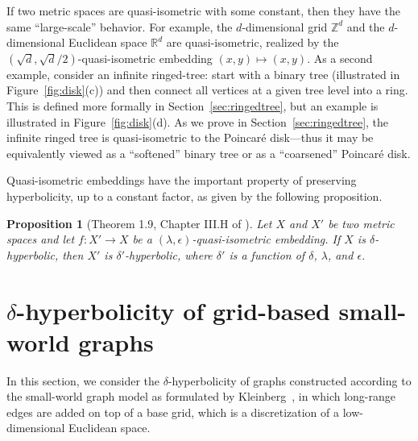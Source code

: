\documentclass[11pt]{article}
\newtheorem{prop}{Proposition}
\begin{document}
\noindent
If two metric spaces are quasi-isometric with some constant, then they have 
the same ``large-scale'' behavior. 
For example, the $d$-dimensional grid $\mathbb{Z}^d$ and the $d$-dimensional 
Euclidean space $\mathbb{R}^d$ are quasi-isometric, realized by the 
$(\sqrt{d}, \sqrt{d}/2)$-quasi-isometric embedding $(x,y) \mapsto (x,y)$.
As a second example, consider an infinite ringed-tree:
start with a binary tree (illustrated in Figure~\ref{fig:disk}(c)) and then 
connect all vertices at a given tree level into a ring.
This is defined more formally in Section~\ref{sec:ringedtree}, but an example
is illustrated in Figure~\ref{fig:disk}(d).
As we prove in Section~\ref{sec:ringedtree}, the infinite ringed tree is quasi-isometric to the 
Poincar\'{e} disk---thus it may be equivalently viewed as a ``softened'' 
binary tree or as a ``coarsened'' Poincar\'{e} disk.

Quasi-isometric embeddings have the important property of preserving 
hyperbolicity, up to a constant factor, as given by the following proposition.

\begin{prop}[Theorem 1.9, Chapter III.H of \cite{BH99}]\label{prop:quasi}
Let $X$ and $X'$ be two metric spaces and let $f: X' \rightarrow X$ be a 
	$(\lambda, \epsilon)$-quasi-isometric embedding.
If $X$ is $\delta$-hyperbolic, then $X'$ is $\delta'$-hyperbolic, where
	$\delta'$ is a function of $\delta$, $\lambda$, and $\epsilon$.
\end{prop}




\section{$\delta$-hyperbolicity of grid-based small-world graphs}\label{sec:smallworld}


In this section, we consider the $\delta$-hyperbolicity of graphs constructed 
according to the small-world graph model as formulated by
Kleinberg~\cite{Kle00}, in which long-range edges are added on top of a base 
grid, which is a discretization of a low-dimensional Euclidean space.
\end{document}
